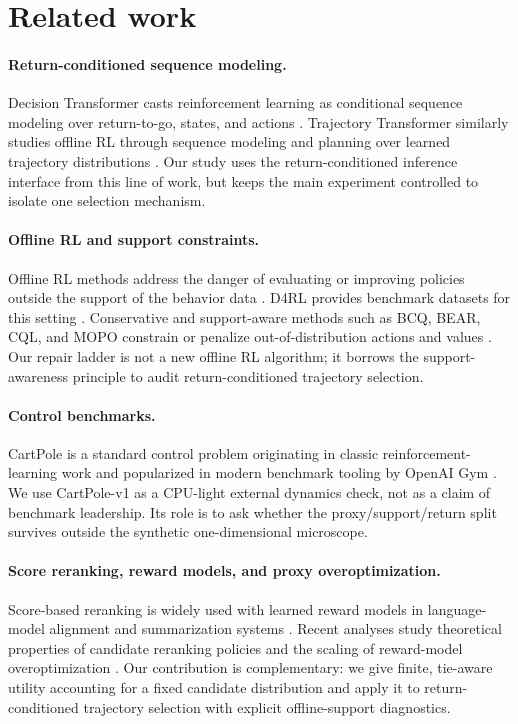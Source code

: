 \section{Related work}
\label{sec:related}

\paragraph{Return-conditioned sequence modeling.}
Decision Transformer casts reinforcement learning as conditional sequence modeling over return-to-go, states, and actions \citep{chen2021decision}. Trajectory Transformer similarly studies offline RL through sequence modeling and planning over learned trajectory distributions \citep{janner2021trajectory}. Our study uses the return-conditioned inference interface from this line of work, but keeps the main experiment controlled to isolate one selection mechanism.

\paragraph{Offline RL and support constraints.}
Offline RL methods address the danger of evaluating or improving policies outside the support of the behavior data \citep{levine2020offline}. D4RL provides benchmark datasets for this setting \citep{fu2021d4rl}. Conservative and support-aware methods such as BCQ, BEAR, CQL, and MOPO constrain or penalize out-of-distribution actions and values \citep{fujimoto2019bcq,kumar2019bear,kumar2020cql,yu2020mopo}. Our repair ladder is not a new offline RL algorithm; it borrows the support-awareness principle to audit return-conditioned trajectory selection.

\paragraph{Control benchmarks.}
CartPole is a standard control problem originating in classic reinforcement-learning work \citep{barto1983neuronlike} and popularized in modern benchmark tooling by OpenAI Gym \citep{brockman2016openai}. We use CartPole-v1 as a CPU-light external dynamics check, not as a claim of benchmark leadership. Its role is to ask whether the proxy/support/return split survives outside the synthetic one-dimensional microscope.

\paragraph{Score reranking, reward models, and proxy overoptimization.}
Score-based reranking is widely used with learned reward models in language-model alignment and summarization systems \citep{stiennon2022summarize,nakano2022webgpt,ouyang2022instructgpt}. Recent analyses study theoretical properties of candidate reranking policies and the scaling of reward-model overoptimization \citep{beirami2025bon,gao2022rewardoveropt}. Our contribution is complementary: we give finite, tie-aware utility accounting for a fixed candidate distribution and apply it to return-conditioned trajectory selection with explicit offline-support diagnostics.

